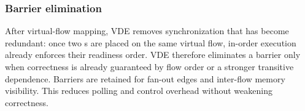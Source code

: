 \subsubsection{Barrier elimination}
After virtual-flow mapping, VDE removes synchronization that has become redundant: once two \mop{}s are placed on the same virtual flow, in-order execution already enforces their readiness order. VDE therefore eliminates a barrier only when correctness is already guaranteed by flow order or a stronger transitive dependence. Barriers are retained for fan-out edges and inter-flow memory visibility. This reduces polling and control overhead without weakening correctness.